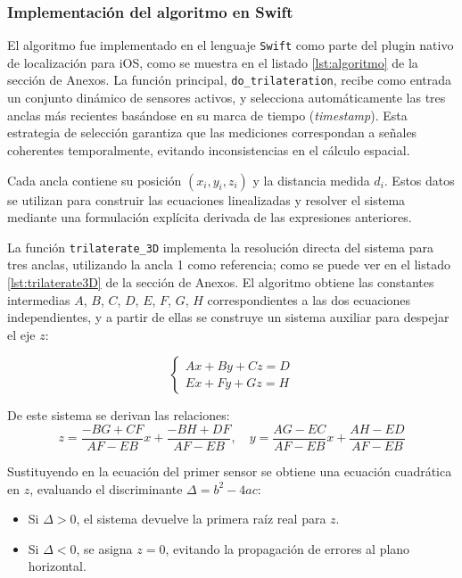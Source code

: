\subsubsection*{Implementación del algoritmo en Swift}

El algoritmo fue implementado en el lenguaje \texttt{Swift} como parte del plugin nativo de localización para iOS, como se muestra en el listado \ref{lst:algoritmo} de la sección de Anexos. La función principal, \texttt{do\_trilateration}, recibe como entrada un conjunto dinámico de sensores activos, y selecciona automáticamente las tres anclas más recientes basándose en su marca de tiempo (\textit{timestamp}). Esta estrategia de selección garantiza que las mediciones correspondan a señales coherentes temporalmente, evitando inconsistencias en el cálculo espacial.

Cada ancla contiene su posición $(x_i, y_i, z_i)$ y la distancia medida $d_i$. Estos datos se utilizan para construir las ecuaciones linealizadas y resolver el sistema mediante una formulación explícita derivada de las expresiones anteriores.

La función \texttt{trilaterate\_3D} implementa la resolución directa del sistema para tres anclas, utilizando la ancla 1 como referencia; como se puede ver en el listado \ref{lst:trilaterate3D} de la sección de Anexos. El algoritmo obtiene las constantes intermedias $A$, $B$, $C$, $D$, $E$, $F$, $G$, $H$ correspondientes a las dos ecuaciones independientes, y a partir de ellas se construye un sistema auxiliar para despejar el eje $z$:

\[
\begin{cases}
A x + B y + C z = D \\
E x + F y + G z = H
\end{cases}
\]

De este sistema se derivan las relaciones:
\[
z = \frac{-B G + C F}{A F - E B}x + \frac{-B H + D F}{A F - E B}, \quad
y = \frac{A G - E C}{A F - E B}x + \frac{A H - E D}{A F - E B}
\]

Sustituyendo en la ecuación del primer sensor se obtiene una ecuación cuadrática en $z$, evaluando el discriminante $\Delta = b^2 - 4ac$:
\begin{itemize}
    \item Si $\Delta > 0$, el sistema devuelve la primera raíz real para $z$.
    \item Si $\Delta < 0$, se asigna $z=0$, evitando la propagación de errores al plano horizontal.
\end{itemize}

